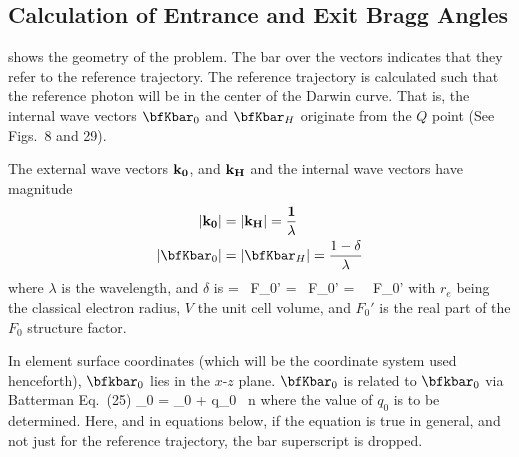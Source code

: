 \subsection{Calculation of Entrance and Exit Bragg Angles}
\label{s:crystal.ref}

 shows the geometry of the
problem. The bar over the vectors indicates that they refer to the
reference trajectory. The reference trajectory is calculated such that
the reference photon will be in the center of the Darwin curve. That
is, the internal wave vectors $\bfKbar_0$ and $\bfKbar_H$ originate
from the $Q$ point (See \cite{b:batterman} Figs.~8 and 29).

The external wave vectors $\bf k_0$, and $\bf k_H$ and the internal wave vectors
have magnitude
\begin{align}
  |\bf k_0| &= |\bf k_H| = \frac{1}{\lambda} 
  \label{kk1l1} \\
  |\bfKbar_0| &= |\bfKbar_H| = \frac{1 - \delta}{\lambda}
  \label{kk1l2}
\end{align}
where $\lambda$ is the wavelength, and $\delta$ is
\Begineq
  \delta =  \, F_0' =  \, F_0'
  =  \, \Gamma \, F_0'
\Endeq
with $r_e$ being the classical electron radius, $V$ the unit cell
volume, and $F_0'$ is the real part of the $F_0$ structure factor. 

In element surface coordinates (which will be the coordinate system used
henceforth), $\bfkbar_0$ lies in the $x$-$z$ plane. $\bfKbar_0$ is
related to $\bfkbar_0$ via Batterman Eq.~(25)
\Begineq
  \bfK_0 = \bfk_0 + q_0 \, \bfhat n
  \label{kkqn1}
\Endeq
where the value of $q_0$ is to be determined. Here, and in equations
below, if the equation is true in general, and not just for the
reference trajectory, the bar superscript is dropped.

